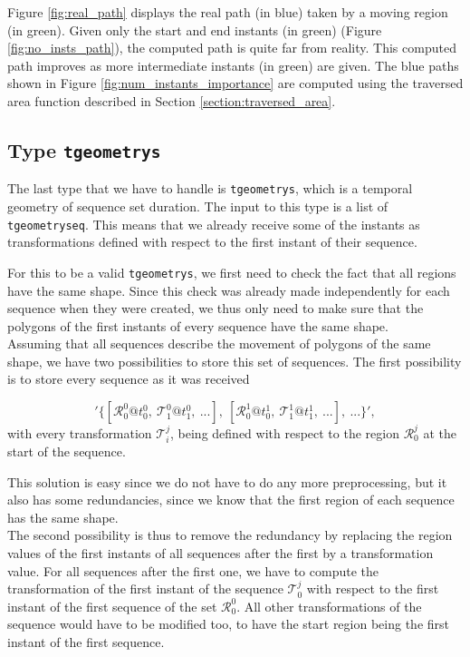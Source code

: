 Figure \ref{fig:real_path} displays the real path (in blue) taken by a moving region (in green). Given only the start and end instants (in green) (Figure \ref{fig:no_insts_path}), the computed path is quite far from reality. This computed path improves as more intermediate instants (in green) are given. The blue paths shown in Figure \ref{fig:num_instants_importance} are computed using the traversed area function described in Section \ref{section:traversed_area}.

\subsection{Type \texttt{tgeometrys}}
\label{section:internal_repr_s}

The last type that we have to handle is \lstinline{tgeometrys}, which is a temporal geometry of sequence set duration. The input to this type is a list of \lstinline{tgeometryseq}. This means that we already receive some of the instants as transformations defined with respect to the first instant of their sequence.

For this to be a valid \lstinline{tgeometrys}, we first need to check the fact that all regions have the same shape. Since this check was already made independently for each sequence when they were created, we thus only need to make sure that the polygons of the first instants of every sequence have the same shape. \\

Assuming that all sequences describe the movement of  polygons of the same shape, we have two possibilities to store this set of sequences. The first possibility is to store every sequence as it was received

\[
    '\{[\mathcal{R}_0^0@t_0^0,\ \mathcal{T}_1^0@t_1^0,\ ...],\ [\mathcal{R}_0^1@t_0^1,\ \mathcal{T}_1^1@t_1^1,\ ...],\ ...\}', 
\]
with every transformation $\mathcal{T}_i^j$, being defined with respect to the region $\mathcal{R}_0^j$ at the start of the sequence.

This solution is easy since we do not have to do any more preprocessing, but it also has some redundancies, since we know that the first region of each sequence has the same shape. \\

The second possibility is thus to remove the redundancy by replacing the region values of the first instants of all sequences after the first by a transformation value. For all sequences after the first one, we have to compute the transformation of the first instant of the sequence $\mathcal{T}_0^j$ with respect to the first instant of the first sequence of the set $\mathcal{R}_0^0$. All other transformations of the sequence would have to be modified too, to have the start region being the first instant of the first sequence.


